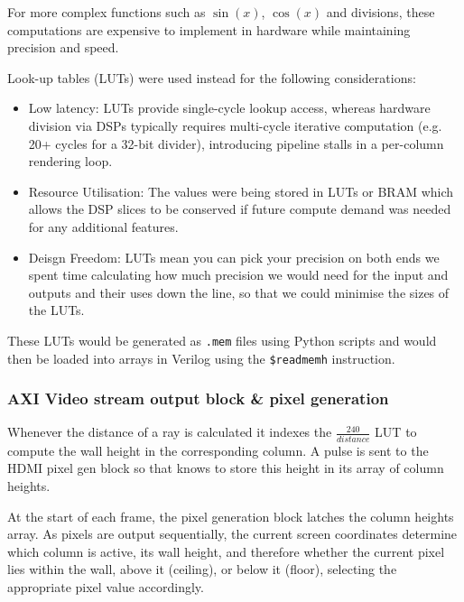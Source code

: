 For more complex functions such as $\sin(x)$, $\cos(x)$ and divisions, these computations are expensive to implement in hardware while maintaining precision and speed.

Look-up tables (LUTs) were used instead for the following considerations:

\begin{itemize}
    \item Low latency: LUTs provide single-cycle lookup access, whereas hardware division via DSPs typically requires multi-cycle iterative computation (e.g. 20+ cycles for a 32-bit divider), introducing pipeline stalls in a per-column rendering loop.
    \item Resource Utilisation: The values were being stored in LUTs or BRAM which allows the DSP slices to be conserved if future compute demand was needed for any additional features.
    \item Deisgn Freedom: LUTs mean you can pick your precision on both ends we spent time calculating how much precision we would need for the input and outputs and their uses down the line, so that we could minimise the sizes of the LUTs.
\end{itemize}
These LUTs would be generated as \texttt{\texttt{.mem}} files using Python scripts and would then be loaded into arrays in Verilog using the \texttt{\$readmemh} instruction.

\subsubsection{AXI Video stream output block \& pixel generation}

Whenever the distance of a ray is calculated it indexes the $\frac{240}{distance}$ LUT to compute the wall height in the corresponding column. A pulse is sent to the HDMI pixel gen block so that knows to store this height in its array of column heights.

At the start of each frame, the pixel generation block latches the column heights array. As pixels are output sequentially, the current screen coordinates determine which column is active, its wall height, and therefore whether the current pixel lies within the wall, above it (ceiling), or below it (floor), selecting the appropriate pixel value accordingly.


